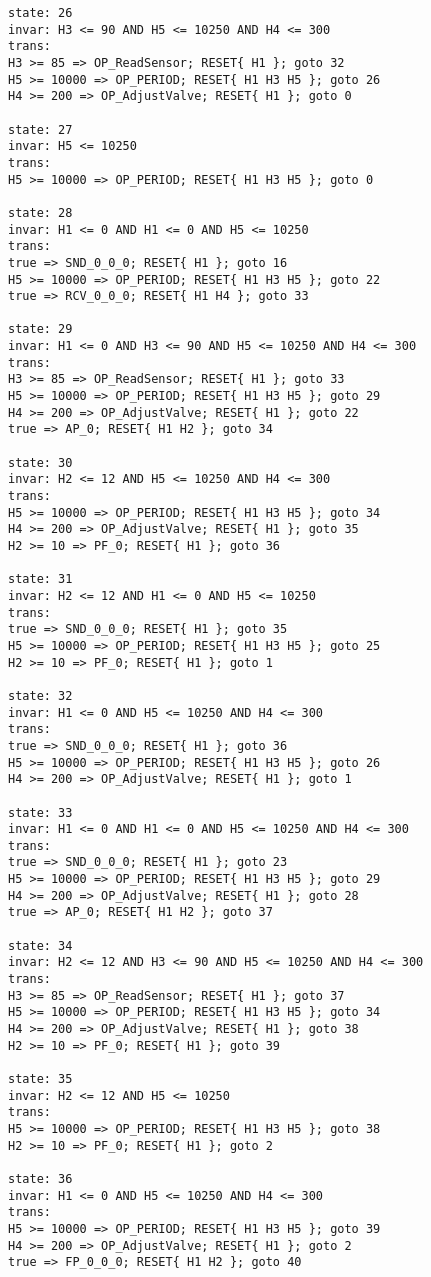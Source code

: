 {\begin{verbatim}
state: 26
invar: H3 <= 90 AND H5 <= 10250 AND H4 <= 300
trans: 
H3 >= 85 => OP_ReadSensor; RESET{ H1 }; goto 32
H5 >= 10000 => OP_PERIOD; RESET{ H1 H3 H5 }; goto 26
H4 >= 200 => OP_AdjustValve; RESET{ H1 }; goto 0

state: 27
invar: H5 <= 10250
trans: 
H5 >= 10000 => OP_PERIOD; RESET{ H1 H3 H5 }; goto 0

state: 28
invar: H1 <= 0 AND H1 <= 0 AND H5 <= 10250
trans: 
true => SND_0_0_0; RESET{ H1 }; goto 16
H5 >= 10000 => OP_PERIOD; RESET{ H1 H3 H5 }; goto 22
true => RCV_0_0_0; RESET{ H1 H4 }; goto 33

state: 29
invar: H1 <= 0 AND H3 <= 90 AND H5 <= 10250 AND H4 <= 300
trans: 
H3 >= 85 => OP_ReadSensor; RESET{ H1 }; goto 33
H5 >= 10000 => OP_PERIOD; RESET{ H1 H3 H5 }; goto 29
H4 >= 200 => OP_AdjustValve; RESET{ H1 }; goto 22
true => AP_0; RESET{ H1 H2 }; goto 34

state: 30
invar: H2 <= 12 AND H5 <= 10250 AND H4 <= 300
trans: 
H5 >= 10000 => OP_PERIOD; RESET{ H1 H3 H5 }; goto 34
H4 >= 200 => OP_AdjustValve; RESET{ H1 }; goto 35
H2 >= 10 => PF_0; RESET{ H1 }; goto 36

state: 31
invar: H2 <= 12 AND H1 <= 0 AND H5 <= 10250
trans: 
true => SND_0_0_0; RESET{ H1 }; goto 35
H5 >= 10000 => OP_PERIOD; RESET{ H1 H3 H5 }; goto 25
H2 >= 10 => PF_0; RESET{ H1 }; goto 1

state: 32
invar: H1 <= 0 AND H5 <= 10250 AND H4 <= 300
trans: 
true => SND_0_0_0; RESET{ H1 }; goto 36
H5 >= 10000 => OP_PERIOD; RESET{ H1 H3 H5 }; goto 26
H4 >= 200 => OP_AdjustValve; RESET{ H1 }; goto 1

state: 33
invar: H1 <= 0 AND H1 <= 0 AND H5 <= 10250 AND H4 <= 300
trans: 
true => SND_0_0_0; RESET{ H1 }; goto 23
H5 >= 10000 => OP_PERIOD; RESET{ H1 H3 H5 }; goto 29
H4 >= 200 => OP_AdjustValve; RESET{ H1 }; goto 28
true => AP_0; RESET{ H1 H2 }; goto 37

state: 34
invar: H2 <= 12 AND H3 <= 90 AND H5 <= 10250 AND H4 <= 300
trans: 
H3 >= 85 => OP_ReadSensor; RESET{ H1 }; goto 37
H5 >= 10000 => OP_PERIOD; RESET{ H1 H3 H5 }; goto 34
H4 >= 200 => OP_AdjustValve; RESET{ H1 }; goto 38
H2 >= 10 => PF_0; RESET{ H1 }; goto 39

state: 35
invar: H2 <= 12 AND H5 <= 10250
trans: 
H5 >= 10000 => OP_PERIOD; RESET{ H1 H3 H5 }; goto 38
H2 >= 10 => PF_0; RESET{ H1 }; goto 2

state: 36
invar: H1 <= 0 AND H5 <= 10250 AND H4 <= 300
trans: 
H5 >= 10000 => OP_PERIOD; RESET{ H1 H3 H5 }; goto 39
H4 >= 200 => OP_AdjustValve; RESET{ H1 }; goto 2
true => FP_0_0_0; RESET{ H1 H2 }; goto 40


\end{verbatim}}
